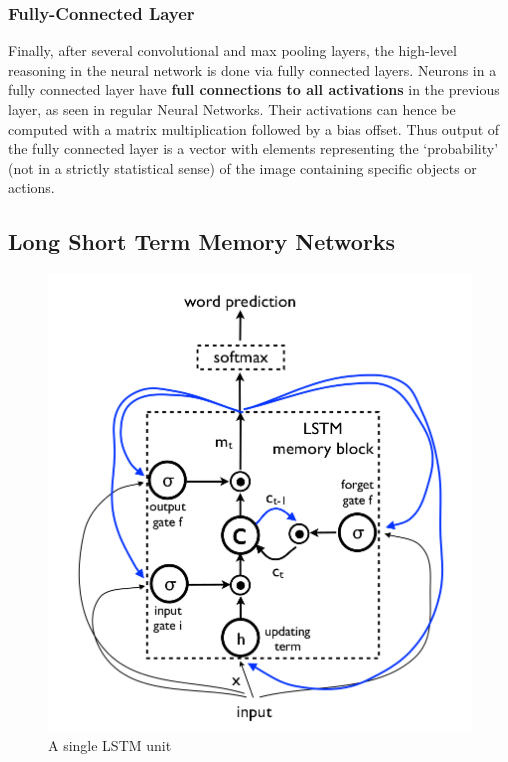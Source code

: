 \documentclass[11pt]{article}
\begin{document}
				\subsubsection{Fully-Connected Layer}
					Finally, after several convolutional and max pooling layers, the high-level reasoning in the neural network is done via fully connected layers. Neurons in a fully connected layer have \textbf{full connections to all activations} in the previous layer, as seen in regular Neural Networks. Their activations can hence be computed with a matrix multiplication followed by a bias offset.\cite{fullyconnected} Thus output of the fully connected layer is a vector with elements representing the `probability' (not in a strictly statistical sense) of the image containing specific objects or actions.

			\subsection{Long Short Term Memory Networks}
			    \begin{figure}[ht!]
			    	\centering
					\includegraphics[scale=0.266]{LSTM_unit.png}
					\caption{A single LSTM unit\label{fig6}}
				\end{figure}
\end{document}
